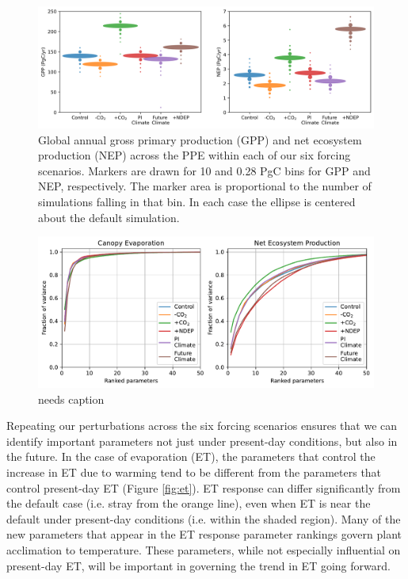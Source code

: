 \documentclass[draft]{agujournal2019}
\begin{document}
\begin{figure}[h]
\centering
\includegraphics[width=\textwidth]{../figs/violins.png}
\caption{Global annual gross primary production (GPP) and net ecosystem production (NEP) across the PPE within each of our six forcing scenarios. Markers are drawn for 10 and 0.28 PgC bins for GPP and NEP, respectively. The marker area is proportional to the number of simulations falling in that bin. In each case the ellipse is centered about the default simulation.}
\label{fig:violins}
\end{figure}

\begin{figure}[h]
\centering
\includegraphics[width=\textwidth]{../figs/variance.pdf}
\caption{needs caption}
\label{fig:violins}
\end{figure}

Repeating our perturbations across the six forcing scenarios ensures that we can identify important parameters not just under present-day conditions, but also in the future. In the case of evaporation (ET), the parameters that control the increase in ET due to warming tend to be different from the parameters that control present-day ET (Figure \ref{fig:et}). 
ET response can differ significantly from the default case (i.e. stray from the orange line), even when ET is near the default under present-day conditions (i.e. within the shaded region).
Many of the new parameters that appear in the ET response parameter rankings govern plant acclimation to temperature. 
These parameters, while not especially influential on present-day ET, will be important in governing the trend in ET going forward.
\end{document}
